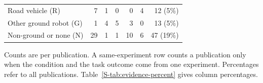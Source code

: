 \begin{table}[!ht]
\begin{tabularx}{\linewidth}{@{}Yrrrrrr@{}}
Road vehicle (R) & 7 & 1 & 0 & 0 & 4 & 12 (5\%) \\
Other ground robot (G) & 1 & 4 & 5 & 3 & 0 & 13 (5\%) \\
Non-ground or none (N) & 29 & 1 & 1 & 10 & 6 & 47 (19\%) \\
\bottomrule
\end{tabularx}
\par\vspace{3pt}\parbox{\linewidth}{\footnotesize\raggedright Counts are per publication. A same-experiment row counts a publication only when the condition and the task outcome come from one experiment. Percentages refer to all \CoreCount{} publications. Table~\ref{S-tab:evidence-percent} gives column percentages.}
\end{table}
